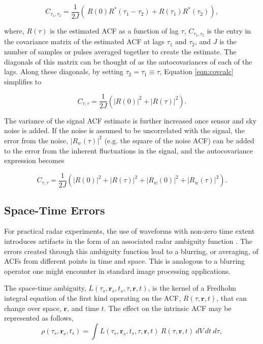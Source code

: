 \documentclass[draft,ras]{agutex}
\begin{document}
\begin{article}
\begin{equation}
\label{eqn:covcalc}
C_{\tau_1,\tau_2} = \frac{1}{2J} \left( \ R(0)  R^*(\tau_1-\tau_2) +  R(\tau_1) R^*(\tau_2) \right),
\end{equation}

\noindent where, $R(\tau)$ is the estimated ACF as a function of lag $\tau$, $C_{\tau_1,\tau_2}$ is the entry in the covariance matrix of the estimated ACF at lags $\tau_1$ and $\tau_2$,  and $J$ is the number of samples or pulses averaged together to create the estimate. The diagonals of this matrix can be thought of as the autocovariances of each of the lags.  Along these diagonals, by setting $\tau_2 = \tau_1 \equiv \tau$, Equation \ref{eqn:covcalc} simplifies to

\begin{equation}
\label{eqn:covdiag}
C_{\tau,\tau} = \frac{1}{2J} \left(  |R(0)|^2 +|R(\tau)|^2\right).
\end{equation}

The variance of the signal ACF estimate is further increased once sensor and sky noise is added.  If the noise is assumed to be uncorrelated with the signal, the error from the noise, $\left|R_w (\tau)\right|^2$ (e.g. the square of the noise ACF) can be added to the error from the inherent fluctuations in the signal, and the autocovariance expression becomes

\begin{equation}
\label{eqn:covdiagwn}
C_{\tau,\tau} = \frac{1}{2J} \left(  |R(0)|^2 +|R(\tau)|^2 + \left|R_w (0)\right|^2+\left|R_w (\tau)\right|^2\right).
\end{equation}

\subsection{Space-Time Errors}

For practical radar experiments, the use of waveforms with non-zero time extent introduces artifacts in the form of an associated radar ambiguity function \citep{nygren1996}.  The errors created through this ambiguity function lead to a blurring, or averaging, of ACFs from different points in time and space. This is analogous to a blurring operator one might encounter in standard image processing applications.
 
The space-time ambiguity, $L(\tau_s,\mathbf{r}_s,t_s,\tau,\mathbf{r},t)$, is the kernel of a Fredholm integral equation of the first kind operating on the ACF, $R(\tau,\mathbf{r},t)$, that can change over space, $\mathbf{r}$, and time $t$. The effect on the intrinsic ACF may be represented as follows,
 \begin{equation}
  \label{eqn:staf}
  \rho(\tau_s,\mathbf{r}_s,t_s) =\int L(\tau_s,\mathbf{r}_s,t_s,\tau,\mathbf{r},t)\:R(\tau,\mathbf{r},t)\ dV\ dt\ d\tau,
\end{equation}


\end{article}
\end{document}
